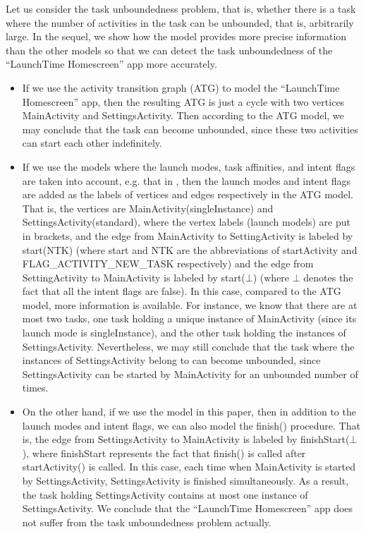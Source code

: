 Let us consider the task unboundedness problem, that is, whether there is a task where the number of activities in the task can be unbounded, that is, arbitrarily large. In the sequel, we show how the {\AMASS} model provides more precise information than the other models so that we can detect the task unboundedness of  the ``LaunchTime Homescreen'' app more accurately. 
\begin{itemize}
\item If we use the activity transition graph (ATG) to model the ``LaunchTime Homescreen'' app, then the resulting ATG is just a cycle with two vertices MainActivity and SettingsActivity. Then according to the ATG model, we may conclude that the task can become unbounded, since these two activities can start each other indefinitely. 
%
\item If we use the models where the launch modes, task affinities, and intent flags are taken into account, e.g. that in \cite{LHR17}, then the launch modes and intent flags are added as the labels of vertices and edges respectively in the ATG model. That is, the vertices are MainActivity(singleInstance) and SettingsActivity(standard), where the vertex labels (launch models) are put in brackets, and the edge from MainActivity to SettingActivity is labeled by start(NTK) (where start and NTK are the abbreviations of startActivity and FLAG\_ACTIVITY\_NEW\_TASK respectively) and the edge from SettingActivity to MainActivity is labeled by start($\bot$) (where $\bot$ denotes the fact that all the intent flags are false). In this case, compared to the ATG model, more information is available. For instance, we know that there are at most two tasks, one task holding a unique instance of MainActivity (since its launch mode is singleInstance), and the other task holding the instances of SettingsActivity. Nevertheless, we may still conclude that the task where the instances of SettingsActivity belong to can become unbounded, since SettingsActivity can be started by MainActivity for an unbounded number of times. 
%
\item On the other hand, if we use the {\AMASS} model in this paper, then in addition to the launch modes and intent flags, we can also model the finish() procedure. That is, the edge from SettingsActivity to MainActivity is labeled by finishStart($\bot$), where finishStart represents the fact that finish() is called after startActivity() is called. In this case, each time when MainActivity is started by SettingsActivity, SettingsActivity is finished simultaneously. As a result, the task holding SettingsActivity contains at most one instance of SettingsActivity. We conclude that the ``LaunchTime Homescreen'' app does not suffer from the task unboundedness problem actually. 
\end{itemize}
